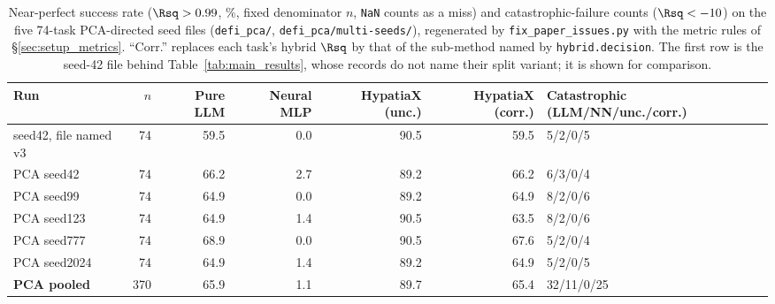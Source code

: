 \begin{table}[h]
\centering
\small
\caption{Near-perfect success rate ($\Rsq>0.99$, \%, fixed denominator $n$, \texttt{NaN} counts as a miss) and catastrophic-failure counts ($\Rsq<-10$) on the five 74-task PCA-directed seed files (\texttt{defi\_pca/}, \texttt{defi\_pca/multi-seeds/}), regenerated by \texttt{fix\_paper\_issues.py} with the metric rules of \S\ref{sec:setup_metrics}. ``Corr.'' replaces each task's hybrid $\Rsq$ by that of the sub-method named by \texttt{hybrid.decision}. The first row is the seed-42 file behind Table~\ref{tab:main_results}, whose records do not name their split variant; it is shown for comparison.}
\label{tab:pca_accuracy}
\begin{tabular}{lrrrrrl}
\toprule
Run & $n$ & Pure LLM & Neural MLP & HypatiaX (unc.) & HypatiaX (corr.) & Catastrophic (LLM/NN/unc./corr.) \\
\midrule
seed42, file named v3 & 74 & 59.5 & 0.0 & 90.5 & 59.5 & 5/2/0/5 \\
\midrule
PCA seed42 & 74 & 66.2 & 2.7 & 89.2 & 66.2 & 6/3/0/4 \\
PCA seed99 & 74 & 64.9 & 0.0 & 89.2 & 64.9 & 8/2/0/6 \\
PCA seed123 & 74 & 64.9 & 1.4 & 90.5 & 63.5 & 8/2/0/6 \\
PCA seed777 & 74 & 68.9 & 0.0 & 90.5 & 67.6 & 5/2/0/4 \\
PCA seed2024 & 74 & 64.9 & 1.4 & 89.2 & 64.9 & 5/2/0/5 \\
\midrule
\rowcolor{black!8}
\textbf{PCA pooled} & 370 & 65.9 & 1.1 & 89.7 & 65.4 & 32/11/0/25 \\
\bottomrule
\end{tabular}
\end{table}
